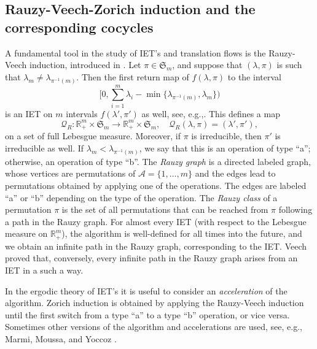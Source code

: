 \documentclass[11pt]{article}
\newcommand{\eg}{e.g.,\xspace}
\newcommand{\Subsection}{\subsection}
\numberwithin{equation}{section}\newcommand{\Relation}[2][]{}\newtheorem*{prop*}{Proposition}
\let\mathcal\mathscr
\newcommand{\sep}{:}
\theoremstyle{plain}
\theoremstyle{definition}
\let\lam\lambda
\newcommand\Frs{\mathfrak{S}}
\newcommand\Ak{\mathcal{A}}
\newcommand\Qk{\mathcal{Q}}
\newcommand{\R}{\mathbb{R}}
\begin{document}
\Subsection{Rauzy-Veech-Zorich induction and the corresponding cocycles} \label{subsec-Rauzy}
A fundamental tool in the study of IET's and translation flows is the Rauzy-Veech induction, introduced in \cite{Veech0,Rauzy}.
Let $\pi\in \Frs_m$, and suppose that $(\lam,\pi)$ is such that $\lam_m \ne \lam_{\pi^{-1}(m)}$. Then the first return map of $f(\lam,\pi)$ to the interval
\[\textstyle
\bigl[0, \sum_{i=1}^m \lam_i - \min\{\lam_{\pi^{-1}(m)},\lam_m\} \bigr)
\]
is an IET on $m$ intervals $f(\lam',\pi')$ as well, see, \eg \cite{viana2,yoccoz}. This defines a map
\[
\Qk_R\sep \R^m_+\times \Frs_m \to \R^m_+\times \Frs_m,\quad \Qk_R(\lam,\pi) = (\lam',\pi'),
\]
on a set of full Lebesgue measure. Moreover, if $\pi$ is irreducible, then $\pi'$ is irreducible as well.
If $\lam_m < \lam_{\pi^{-1}(m)}$, we say that this is an operation of type ``a''; otherwise, an operation of type ``b''. The \emph{Rauzy graph} is a directed labeled graph, whose vertices are permutations of $\Ak=\{1,\ldots,m\}$ and the edges lead to permutations obtained by applying one of the operations. The edges are labeled ``a'' or ``b'' depending on the type of the operation. The \emph{Rauzy class} of a permutation $\pi$ is the set of all permutations that can be reached from $\pi$ following a path in the Rauzy graph. For almost every IET (with respect to the Lebesgue measure on $\R^m_+$), the algorithm is well-defined for all times into the future, and we obtain an infinite path in the Rauzy graph, corresponding to the IET. Veech \cite{veech} proved that, conversely, every infinite path in the Rauzy graph arises from an IET in a such a way.

In the ergodic theory of IET's it is useful to consider an \emph{acceleration} of the algorithm. Zorich induction \cite{Zorich,Zorich1} is obtained by applying the Rauzy-Veech induction until the first switch from a type ``a'' to a type ``b'' operation, or vice versa.
Sometimes other versions of the algorithm and accelerations are used, see, \eg Marmi, Moussa, and Yoccoz \cite{MMY}.
\end{document}
